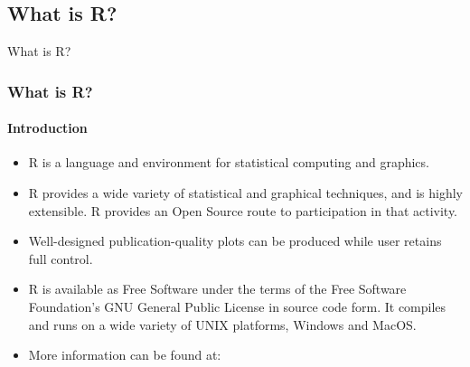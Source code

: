 \documentclass[
	11pt, %
]{beamer}
\begin{document}
\subsection{What is R?}
\begin{frame}[fragile]{What is R?}
	\frametitle{What is R?}
	\framesubtitle{Introduction} %
    \begin{block}{}
	\begin{itemize}
\small
\item R is a language and environment for statistical computing and graphics. 

\item R provides a wide variety of statistical and graphical techniques, and is highly extensible. R provides an Open Source route to participation in that activity.

\item Well-designed publication-quality plots can be produced while user retains full control.

\item R is available as Free Software under the terms of the Free Software Foundation’s GNU General Public License in source code form. It compiles and runs on a wide variety of UNIX platforms, Windows and MacOS.

\item More information can be found at:\href{hhtp://r-project.org/}{}



\end{itemize}

	\end{block}
	
	\end{frame}
	
\end{document}
